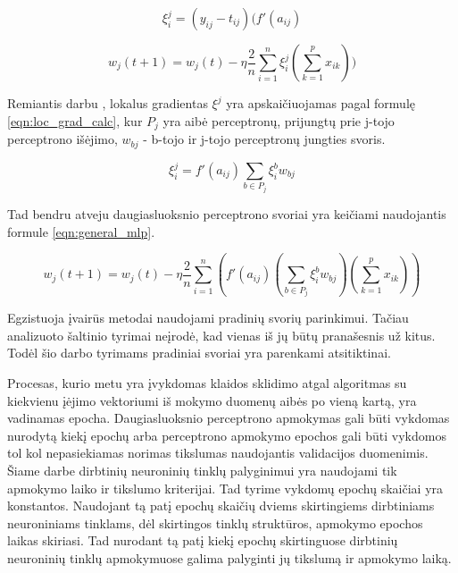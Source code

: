 \begin{equation}
\label{eqn:loc_grad}
	\xi^j_i = (y_{ij} - t_{ij})(f'(a_{ij})
\end{equation}

\begin{equation}
\label{eqn:general_with_loc_grad}
	w_j(t + 1) = w_j(t) - \eta \dfrac{2}{n}\sum_{i = 1}^{n} \xi^j_i(\sum_{k = 1}^{p} x_{ik}))
\end{equation}

Remiantis darbu \cite{feedbackAlg}, lokalus gradientas $\xi^j$ yra apskaičiuojamas pagal formulę \ref{eqn:loc_grad_calc}, kur $P_j$ yra aibė perceptronų, prijungtų prie j-tojo perceptrono išėjimo, $w_{bj}$ - b-tojo ir j-tojo perceptronų jungties svoris.

\begin{equation}
\label{eqn:loc_grad_calc}
	\xi^j_i = f'(a_{ij})\sum_{b \in P_j}\xi^b_i w_{bj}
\end{equation}

Tad bendru atveju daugiasluoksnio perceptrono svoriai yra keičiami naudojantis formule \ref{eqn:general_mlp}.

\begin{equation}
\label{eqn:general_mlp}
w_j(t + 1) = w_j(t) - \eta \dfrac{2}{n}\sum_{i = 1}^{n} (f'(a_{ij})(\sum_{b \in P_j}\xi^b_i w_{bj})(\sum_{k = 1}^{p} x_{ik}))
\end{equation}

Egzistuoja įvairūs metodai naudojami pradinių svorių parinkimui. Tačiau analizuoto šaltinio \cite{initNN} tyrimai neįrodė, kad vienas iš jų būtų pranašesnis už kitus. Todėl šio darbo tyrimams pradiniai svoriai yra parenkami atsitiktinai.

Procesas, kurio metu yra įvykdomas klaidos sklidimo atgal algoritmas su kiekvienu įėjimo vektoriumi iš mokymo duomenų aibės po vieną kartą, yra vadinamas epocha. Daugiasluoksnio perceptrono apmokymas gali būti vykdomas nurodytą kiekį epochų arba perceptrono apmokymo epochos gali būti vykdomos tol kol nepasiekiamas norimas tikslumas naudojantis validacijos duomenimis. Šiame darbe dirbtinių neuroninių tinklų palyginimui yra naudojami tik apmokymo laiko ir tikslumo kriterijai. Tad tyrime vykdomų epochų skaičiai yra konstantos. Naudojant tą patį epochų skaičių dviems skirtingiems dirbtiniams neuroniniams tinklams, dėl skirtingos tinklų struktūros, apmokymo epochos laikas skiriasi. Tad nurodant tą patį kiekį epochų skirtinguose dirbtinių neuroninių tinklų apmokymuose galima palyginti jų tikslumą ir apmokymo laiką.

